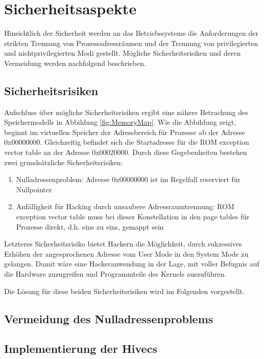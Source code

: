 \section{Sicherheitsaspekte}

Hinsichtlich der Sicherheit werden an das Betriebssystems die Anforderungen der strikten Trennung von Prozessadressräumen und der Trennung von privilegierten und nichtprivilegierten Modi gestellt. Mögliche Sicherheitsrisiken und deren Vermeidung werden nachfolgend beschrieben.

 

\subsection{Sicherheitsrisiken}

Aufschluss über mögliche Sicherheitsrisiken ergibt eine nähere Betrachung des Speichermodells in Abbildung \ref{fig:MemoryMap}. Wie die Abbildung zeigt, beginnt im virtuellen Speicher der Adressbereich für Prozesse ab der Adresse 0x00000000. Gleichzeitig befindet sich die Startadresse für die ROM exception vector table an der Adresse 0x00020000. Durch diese Gegebenheiten bestehen zwei grundsätzliche Sicherheitsrisiken:

\begin{enumerate}
	\item Nulladressenproblem: Adresse 0x00000000 ist im Regelfall reserviert für Nullpointer
	\item Anfälligkeit für Hacking durch unsaubere Adressraumtrennung: ROM exception vector table muss bei dieser Konstellation in den page tables für Prozesse direkt, d.h. eins zu eins, gemappt sein
\end{enumerate}

Letzteres Sicherheitsrisiko bietet Hackern die Möglichkeit, durch sukzessives Erhöhen der angesprochenen Adresse vom User Mode in den System Mode zu gelangen. Damit wäre eine Hackeranwendung in der Lage, mit voller Befugnis auf die Hardware zuzugreifen und Programmteile des Kernels auszuführen.

Die Lösung für diese beiden Sicherheitsrisiken wird im Folgenden vorgestellt.

\subsection{Vermeidung des Nulladressenproblems}

\subsection{Implementierung der Hivecs}

\pagebreak 